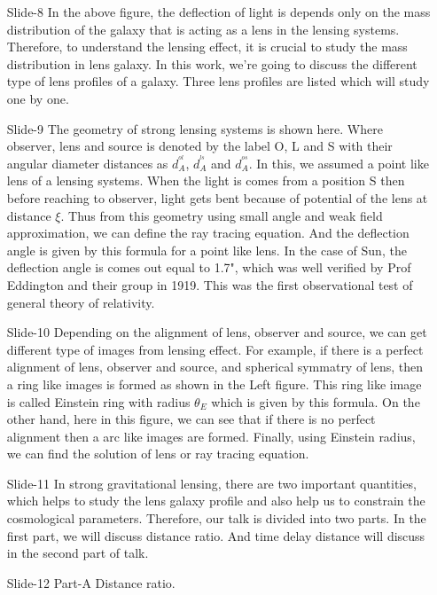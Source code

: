 \documentclass[12pt]{report}
\begin{document}
\begin{itemize}
 \item[\ding{74} Slide-8]
In the above figure, the deflection of light is depends only on the mass distribution of the galaxy that is acting as a lens in the lensing systems. Therefore, to understand the lensing effect, it is crucial to study the mass distribution in lens galaxy. In this work, we're going to discuss the different type of lens profiles of a galaxy. Three lens profiles are listed which will study one by one.

\item[\ding{74} Slide-9] 
The geometry of strong lensing systems is shown here. Where observer, lens and source is denoted by the label O, L and S with their angular diameter distances as $d_{A}^{^{ol}}$, $d_{A}^{^{ls}}$ and $d_{A}^{^{os}}$. In this, we assumed a point like lens of a lensing systems. When the light is comes from a position S then before reaching to observer, light gets bent because of potential of the lens at distance $\xi$. Thus from this geometry  using small angle and weak field approximation, we can define the ray tracing equation. And the deflection angle is given by this formula for a point like lens. In the case of Sun, the deflection angle is comes out equal to 1.7", which was well verified by Prof Eddington and their group in 1919. This was the first observational test of general theory of relativity.

\item[\ding{74} Slide-10]
Depending on the alignment of lens, observer and source, we can get different type of images from lensing effect. For example, if there is a perfect alignment of lens, observer and source, and spherical symmatry of lens, then a ring like images is formed as shown in the Left figure. This ring like image is called Einstein ring with radius $\theta_E$ which is given by this formula. On the other hand, here in this figure, we can see that if there is no perfect alignment then a arc like images are formed. Finally, using Einstein radius, we can find the solution of lens or ray tracing equation.

\item[\ding{74} Slide-11]
 In strong gravitational lensing, there are two important quantities, which helps to study the lens galaxy profile and also help us to constrain the cosmological parameters. Therefore, our talk is divided into two parts. In the first part, we will discuss distance ratio. And time delay distance will discuss in the second part of talk. 

\item[\ding{74} Slide-12]
\hspace{5cm} Part-A Distance ratio.


\end{itemize}
\end{document}
